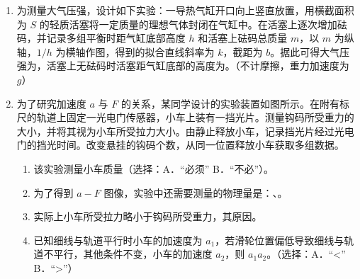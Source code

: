 \documentclass[\gkver]{gaokaozhenti}
\begin{document}
\begin{enumerate}
\item
为测量大气压强，设计如下实验：一导热气缸开口向上竖直放置，用横截面积为 $S$ 的轻质活塞将一定质量的理想气体封闭在气缸中。在活塞上逐次增加砝码，并记录多组平衡时距气缸底部高度 $h$ 和活塞上砝码总质量 $m$，以 $m$ 为纵轴，$1/h$ 为横轴作图，得到的拟合直线斜率为 $k$，截距为 $b$。据此可得大气压强为，活塞上无砝码时活塞距气缸底部的高度为。（不计摩擦，重力加速度为 $g$）
\onepicture[align=right, w=2.49cm]{}

\item
为了研究加速度 $a$ 与 $F$ 的关系，某同学设计的实验装置如图所示。在附有标尺的轨道上固定一光电门传感器，小车上装有一挡光片。测量钩码所受重力的大小，并将其视为小车所受拉力大小。由静止释放小车，记录挡光片经过光电门的挡光时间。改变悬挂的钩码个数，从同一位置释放小车获取多组数据。
\begin{enumerate}
	\item
	该实验测量小车质量（选择：A．“必须”   B．“不必”）。
	\item
	为了得到 $a-F$ 图像，实验中还需要测量的物理量是：、。
	\item
	实际上小车所受拉力略小于钩码所受重力，其原因。
	\item
	已知细线与轨道平行时小车的加速度为 $a_{1}$，若滑轮位置偏低导致细线与轨道不平行，其他条件不变，小车的加速度 $a_{2}$，则 $a_{1}$$a_{2}$。（选择：A．“<”       B．“>”）
\end{enumerate}
\onepicture[align=right, w=6.50cm]{}
\end{enumerate}
\end{document}
